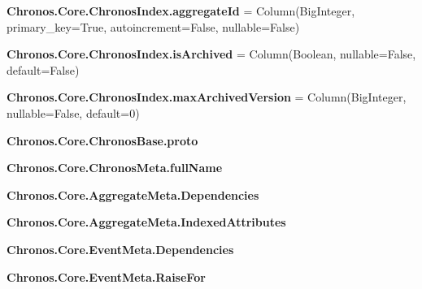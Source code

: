 \begin{DoxyCompactItemize}
\item 
{\bfseries Chronos.\+Core.\+Chronos\+Index.\+aggregate\+Id} = Column(Big\+Integer, primary\+\_\+key=True, autoincrement=False, nullable=False)\hypertarget{group__Chronos_ga16cbb8b5cd7ee9a4383badd6c627ccf5}{}\label{group__Chronos_ga16cbb8b5cd7ee9a4383badd6c627ccf5}

\item 
{\bfseries Chronos.\+Core.\+Chronos\+Index.\+is\+Archived} = Column(Boolean, nullable=False, default=False)\hypertarget{group__Chronos_ga01e03cfce96ad39cdd782e9ecbfba932}{}\label{group__Chronos_ga01e03cfce96ad39cdd782e9ecbfba932}

\item 
{\bfseries Chronos.\+Core.\+Chronos\+Index.\+max\+Archived\+Version} = Column(Big\+Integer, nullable=False, default=0)\hypertarget{group__Chronos_ga3b2663961753174052d51183c9fd5b40}{}\label{group__Chronos_ga3b2663961753174052d51183c9fd5b40}

\item 
{\bfseries Chronos.\+Core.\+Chronos\+Base.\+proto}\hypertarget{group__Chronos_gad30f8b9897cf84352c9acbeefda28685}{}\label{group__Chronos_gad30f8b9897cf84352c9acbeefda28685}

\item 
{\bfseries Chronos.\+Core.\+Chronos\+Meta.\+full\+Name}\hypertarget{group__Chronos_ga8aaa0b82ef8766ab81967e9e6207dedb}{}\label{group__Chronos_ga8aaa0b82ef8766ab81967e9e6207dedb}

\item 
{\bfseries Chronos.\+Core.\+Aggregate\+Meta.\+Dependencies}\hypertarget{group__Chronos_ga4d8854dbda7dd2b36edc4edf83e8f798}{}\label{group__Chronos_ga4d8854dbda7dd2b36edc4edf83e8f798}

\item 
{\bfseries Chronos.\+Core.\+Aggregate\+Meta.\+Indexed\+Attributes}\hypertarget{group__Chronos_ga1871b6d5370886cb037f52eb05100522}{}\label{group__Chronos_ga1871b6d5370886cb037f52eb05100522}

\item 
{\bfseries Chronos.\+Core.\+Event\+Meta.\+Dependencies}\hypertarget{group__Chronos_ga5c3706626fec921a58c947118103c2e2}{}\label{group__Chronos_ga5c3706626fec921a58c947118103c2e2}

\item 
{\bfseries Chronos.\+Core.\+Event\+Meta.\+Raise\+For}\hypertarget{group__Chronos_ga30c538261b4329eaf696c15dde690f5d}{}\label{group__Chronos_ga30c538261b4329eaf696c15dde690f5d}


\end{DoxyCompactItemize}
